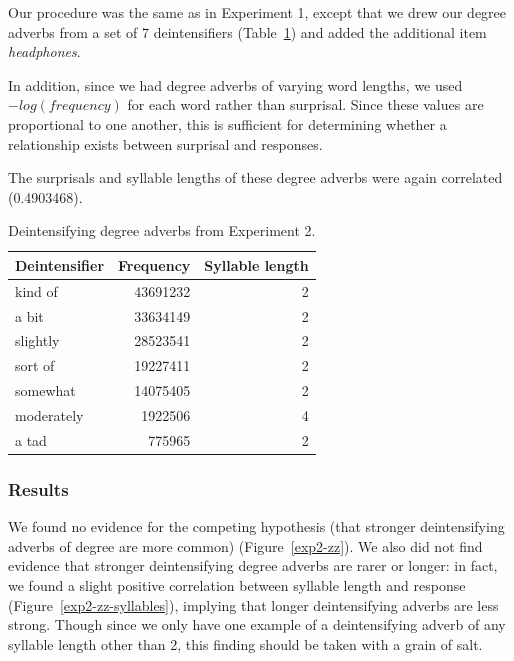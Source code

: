 \documentclass[10pt,letterpaper]{article}
\begin{document}
      Our procedure was the same as in Experiment 1, except that we drew our degree adverbs from a set of 7 deintensifiers (Table~\ref{deintensifiers-table}) and added the additional item \emph{headphones}.
      
      In addition, since we had degree adverbs of varying word lengths, we used $-log(frequency)$ for each word rather than surprisal. Since these values are proportional to one another, this is sufficient for determining whether a relationship exists between surprisal and responses.
      
      The surprisals and syllable lengths of these degree adverbs were again correlated (0.4903468).
      
      \begin{table}[!ht]
      \begin{center} 
      \caption{Deintensifying degree adverbs from Experiment 2.} 
      \label{deintensifiers-table} 
      \vskip 0.12in
      \begin{tabular}{lrr} 
      \hline
      Deintensifier    &  Frequency & Syllable length \\
      \hline
      kind of & 43691232 & 2 \\ 
      a bit & 33634149 & 2 \\ 
      slightly & 28523541 & 2 \\ 
      sort of & 19227411 & 2 \\ 
      somewhat & 14075405 & 2 \\ 
      moderately & 1922506 & 4 \\ 
      a tad & 775965 & 2 \\  
      \hline
      \end{tabular} 
      \end{center} 
      \end{table}
  \subsubsection{Results}     
    
    We found no evidence for the competing hypothesis (that stronger deintensifying adverbs of degree are more common) (Figure~\ref{exp2-zz}). We also did not find evidence that stronger deintensifying degree adverbs are rarer or longer: in fact, we found a slight positive correlation between syllable length and response (Figure~\ref{exp2-zz-syllables}), implying that longer deintensifying adverbs are less strong. Though since we only have one example of a deintensifying adverb of any syllable length other than 2, this finding should be taken with a grain of salt.
  
\end{document}
